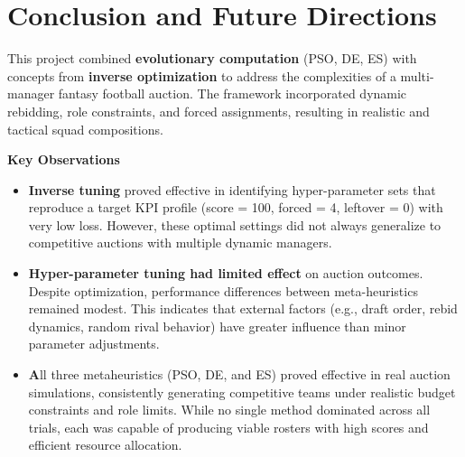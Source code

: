 \documentclass[sigconf]{acmart}
\begin{document}
	
\section{Conclusion and Future Directions}
\label{sec:conclusion}

This project combined \textbf{evolutionary computation} (PSO, DE, ES) with concepts from \textbf{inverse optimization} to address the complexities of a multi-manager fantasy football auction. The framework incorporated dynamic rebidding, role constraints, and forced assignments, resulting in realistic and tactical squad compositions.

\textbf{Key Observations}

\begin{itemize}
	\item \textbf{Inverse tuning} proved effective in identifying hyper-parameter sets that reproduce a target KPI profile (score = 100, forced = 4, leftover = 0) with very low loss. However, these optimal settings did not always generalize to competitive auctions with multiple dynamic managers.
	
	\item \textbf{Hyper-parameter tuning had limited effect} on auction outcomes. Despite optimization, performance differences between meta-heuristics remained modest. This indicates that external factors (e.g., draft order, rebid dynamics, random rival behavior) have greater influence than minor parameter adjustments.
	
	\item \textbf All three metaheuristics (PSO, DE, and ES) proved effective in real auction simulations, consistently generating competitive teams under realistic budget constraints and role limits. While no single method dominated across all trials, each was capable of producing viable rosters with high scores and efficient resource allocation.
	
\end{itemize}
\end{document}
